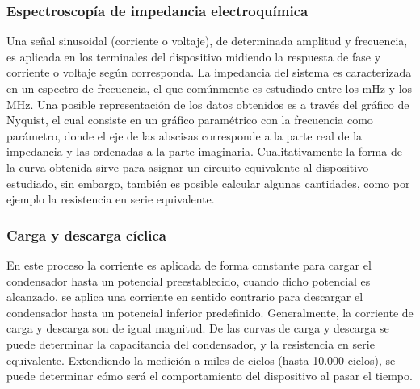\subsubsection{Espectroscopía de impedancia electroquímica}
Una señal sinusoidal (corriente o voltaje), de determinada amplitud y frecuencia, es aplicada en los terminales del dispositivo midiendo la respuesta de fase y corriente o voltaje según corresponda. La impedancia del sistema es caracterizada en un espectro de frecuencia, el que comúnmente es estudiado entre los mHz y los MHz. Una posible representación de los datos obtenidos es a través del gráfico de Nyquist, el cual consiste en un gráfico paramétrico con la frecuencia como parámetro, donde el eje de las abscisas corresponde a la parte real de la impedancia y las ordenadas a la parte imaginaria. Cualitativamente la forma de la curva obtenida sirve para asignar un circuito equivalente al dispositivo estudiado, sin embargo, también es posible calcular algunas cantidades, como por ejemplo la resistencia en serie equivalente.

\subsubsection{Carga y descarga cíclica}
En este proceso la corriente es aplicada de forma constante para cargar el condensador hasta un potencial preestablecido, cuando dicho potencial es alcanzado, se aplica una corriente en sentido contrario para descargar el condensador hasta un potencial inferior predefinido. Generalmente, la corriente de carga y descarga son de igual magnitud. De las curvas de carga y descarga se puede determinar la capacitancia del condensador, y la resistencia en serie equivalente. Extendiendo la medición a miles de ciclos (hasta 10.000 ciclos), se puede determinar cómo será el comportamiento del dispositivo al pasar el tiempo.